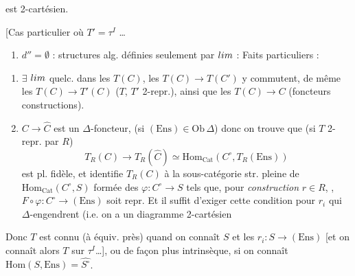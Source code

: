 \documentclass[11pt,a4paper]{article}
\begin{document}
est 2-cartésien.

[Cas particulier où $T' = \tau^{I}$ …

\begin{enumerate}
  \item[(4)]  $d'' = \emptyset$ :
    structures alg. définies seulement par $\varprojlim$ : Faits
    particuliers :
\end{enumerate}

\begin{enumerate}
      \item[1°)] $\exists$ $\varprojlim$ quelc. dans les $T(C)$, les
        $T(C) \to T(C')$ y commutent, de même les $T(C) \to T'(C)$
        ($T$, $T'$ 2-repr.), ainsi que les $T(C) \to C$ (foncteurs
        constructions).
      \item[2°)] $C \to \hat{C}$ est un $\Delta$-foncteur,
        \struck{\ill{}} (si $(\mathrm{Ens}) \in \mathrm{Ob}\,\Delta$)
        donc on trouve que (si $T$ 2-repr. par $R$)
        \[
          T_{R}(C) \longrightarrow T_{R}(\hat{C}) \simeq
          \mathrm{Hom}_{\mathrm{Cat}}(C^{\circ}, T_{R}(\mathrm{Ens}))
        \]
        est pl. fidèle, et identifie $T_{R}(C)$ à la sous-catégorie str.
        pleine de $\mathrm{Hom}_{\mathrm{Cat}}(C^{\circ}, S)$ formée des
        $\varphi : C^{\circ} \to S$ tels que, pour \ill{} \ill{}
        \emph{construction} $r \in R$, , $F \circ \varphi : C^{\circ} \to (\mathrm{Ens})$
        soit repr. Et il suffit d'exiger cette condition pour \ill{}
        \ill{} $r_{i}$ qui $\Delta$-engendrent (i.e. on a un diagramme
        2-cartésien


\end{enumerate}

Donc $T$ est connu (à équiv. près) quand on connaît $S$ et les $r_{i} :
S \to (\mathrm{Ens})$ [et on connaît alors $T$ sur $\tau^{I}$…], ou
de façon plus intrinsèque, si on connaît 
\struck{\ill{}} $\mathrm{Hom}(S, \mathrm{Ens}) = \widehat{S^{\circ}}$.
\end{document}
